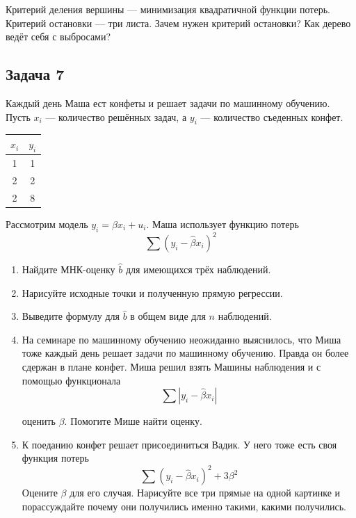 \documentclass[12pt, a4paper, oneside]{article}
\begin{document}
Критерий деления вершины --- минимизация квадратичной функции потерь. Критерий остановки --- три листа.  Зачем нужен критерий остановки? Как дерево ведёт себя с выбросами? 

\subsection*{Задача 7}

Каждый день Маша ест конфеты и решает задачи по машинному обучению. Пусть $x_i$ — количество решённых задач, а $y_i$ — количество съеденных конфет.

\begin{center}
\begin{tabular}{c|c}
	\hline
	$x_i$ & $y_i$ \\
	\hline
	1 & 1 \\
	2 & 2 \\
	2 & 8 \\
\end{tabular}
\end{center}

Рассмотрим модель $y_i = \beta x_i + u_i$. Маша использует функцию потерь 
\[
\sum (y_i - \hat \beta x_i )^2
\]

\begin{enumerate}
	\item Найдите МНК-оценку $\hat b$ для имеющихся трёх наблюдений.
	\item Нарисуйте исходные точки и полученную прямую
	регрессии.
	\item Выведите формулу для $\hat b$ в общем виде для $n$ наблюдений.
	\item На семинаре по машинному обучению неожиданно выяснилось, что Миша тоже каждый день решает задачи по машинному обучению. Правда он более сдержан в плане конфет. Миша решил взять Машины наблюдения и с помощью функционала 
	\[
	\sum |y_i - \hat \beta x_i |
	\]  
	
	оценить $\beta$. Помогите Мише найти оценку. 
	\item К поеданию конфет решает присоединиться Вадик. У него тоже есть своя функция потерь
	\[
	\sum (y_i - \hat \beta x_i)^2 + 3\beta^2
	\]  	
	Оцените $\beta$ для его случая. Нарисуйте все три прямые на одной картинке и порассуждайте почему они получились именно такими, какими получились. 
\end{enumerate}
\end{document}
